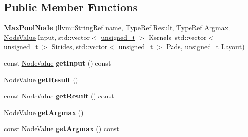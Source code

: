 \subsection*{Public Member Functions}
\begin{DoxyCompactItemize}
\item 
\mbox{\label{classglow_1_1_max_pool_node_ad52a016a985230efbde56f136fcc7e67}} 
{\bfseries Max\+Pool\+Node} (llvm\+::\+String\+Ref name, \hyperlink{structglow_1_1_type}{Type\+Ref} Result, \hyperlink{structglow_1_1_type}{Type\+Ref} Argmax, \hyperlink{structglow_1_1_node_value}{Node\+Value} Input, std\+::vector$<$ \hyperlink{namespaceglow_a0ca574644e1e42ef193a9947fb4d8911}{unsigned\+\_\+t} $>$ Kernels, std\+::vector$<$ \hyperlink{namespaceglow_a0ca574644e1e42ef193a9947fb4d8911}{unsigned\+\_\+t} $>$ Strides, std\+::vector$<$ \hyperlink{namespaceglow_a0ca574644e1e42ef193a9947fb4d8911}{unsigned\+\_\+t} $>$ Pads, \hyperlink{namespaceglow_a0ca574644e1e42ef193a9947fb4d8911}{unsigned\+\_\+t} Layout)
\item 
\mbox{\label{classglow_1_1_max_pool_node_adb59ca1fd0b1e0da689962f838502a50}} 
const \hyperlink{structglow_1_1_node_value}{Node\+Value} {\bfseries get\+Input} () const
\item 
\mbox{\label{classglow_1_1_max_pool_node_a465ec55ad0df6b73b9bcbfd4c9b559c6}} 
\hyperlink{structglow_1_1_node_value}{Node\+Value} {\bfseries get\+Result} ()
\item 
\mbox{\label{classglow_1_1_max_pool_node_a98c463a96a19f571de7c0804980fe1cd}} 
const \hyperlink{structglow_1_1_node_value}{Node\+Value} {\bfseries get\+Result} () const
\item 
\mbox{\label{classglow_1_1_max_pool_node_a8770b1b2385fddb1990b551cce9985f0}} 
\hyperlink{structglow_1_1_node_value}{Node\+Value} {\bfseries get\+Argmax} ()
\item 
\mbox{\label{classglow_1_1_max_pool_node_a6c11cc7587f4b5ca738ba2cd45814bdc}} 
const \hyperlink{structglow_1_1_node_value}{Node\+Value} {\bfseries get\+Argmax} () const
\item 
\mbox{\label{classglow_1_1_max_pool_node_ace98fbeacc38889247d840a1515080bf}} 

\end{DoxyCompactItemize}
